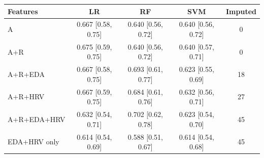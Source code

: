\begin{tabular}{@{}lcccc@{}}
\toprule
Features & LR & RF & SVM & Imputed \\
\midrule
A & 0.667 [0.58, 0.75] & 0.640 [0.56, 0.72] & 0.640 [0.56, 0.72] & 0 \\
A+R & 0.675 [0.59, 0.75] & 0.640 [0.56, 0.72] & 0.640 [0.57, 0.71] & 0 \\
A+R+EDA & 0.667 [0.58, 0.75] & 0.693 [0.61, 0.77] & 0.623 [0.55, 0.69] & 18 \\
A+R+HRV & 0.667 [0.59, 0.75] & 0.684 [0.61, 0.76] & 0.632 [0.56, 0.71] & 27 \\
A+R+EDA+HRV & 0.632 [0.54, 0.71] & 0.702 [0.62, 0.78] & 0.623 [0.54, 0.70] & 45 \\
EDA+HRV only & 0.614 [0.54, 0.69] & 0.588 [0.51, 0.67] & 0.614 [0.54, 0.68] & 45 \\
\bottomrule
\end{tabular}
